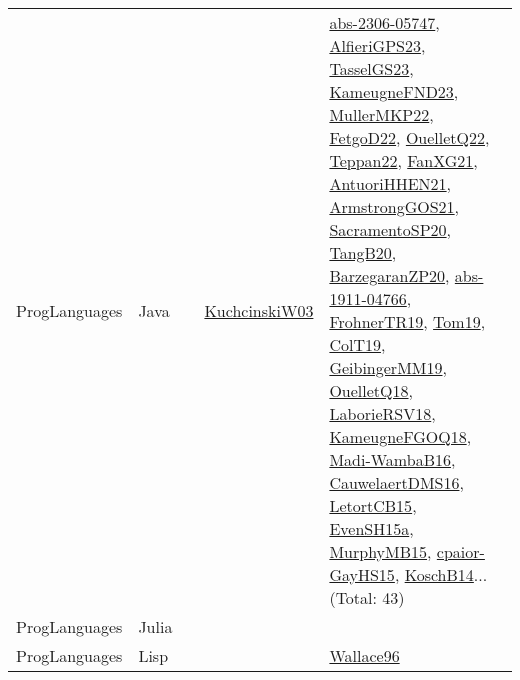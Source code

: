 {\begin{longtable}{lp{3cm}>{\raggedright}p{6cm}>{\raggedright}p{6cm}p{8cm}}
ProgLanguages & Java &  & \href{articles/KuchcinskiW03.pdf}{KuchcinskiW03}\cite{KuchcinskiW03} & \href{articles/abs-2306-05747.pdf}{abs-2306-05747}\cite{abs-2306-05747}, \href{articles/AlfieriGPS23.pdf}{AlfieriGPS23}\cite{AlfieriGPS23}, \href{papers/TasselGS23.pdf}{TasselGS23}\cite{TasselGS23}, \href{papers/KameugneFND23.pdf}{KameugneFND23}\cite{KameugneFND23}, \href{articles/MullerMKP22.pdf}{MullerMKP22}\cite{MullerMKP22}, \href{articles/FetgoD22.pdf}{FetgoD22}\cite{FetgoD22}, \href{papers/OuelletQ22.pdf}{OuelletQ22}\cite{OuelletQ22}, \href{papers/Teppan22.pdf}{Teppan22}\cite{Teppan22}, \href{articles/FanXG21.pdf}{FanXG21}\cite{FanXG21}, \href{papers/AntuoriHHEN21.pdf}{AntuoriHHEN21}\cite{AntuoriHHEN21}, \href{papers/ArmstrongGOS21.pdf}{ArmstrongGOS21}\cite{ArmstrongGOS21}, \href{articles/SacramentoSP20.pdf}{SacramentoSP20}\cite{SacramentoSP20}, \href{papers/TangB20.pdf}{TangB20}\cite{TangB20}, \href{papers/BarzegaranZP20.pdf}{BarzegaranZP20}\cite{BarzegaranZP20}, \href{articles/abs-1911-04766.pdf}{abs-1911-04766}\cite{abs-1911-04766}, \href{papers/FrohnerTR19.pdf}{FrohnerTR19}\cite{FrohnerTR19}, \href{papers/Tom19.pdf}{Tom19}\cite{Tom19}, \href{papers/ColT19.pdf}{ColT19}\cite{ColT19}, \href{papers/GeibingerMM19.pdf}{GeibingerMM19}\cite{GeibingerMM19}, \href{papers/OuelletQ18.pdf}{OuelletQ18}\cite{OuelletQ18}, \href{articles/LaborieRSV18.pdf}{LaborieRSV18}\cite{LaborieRSV18}, \href{papers/KameugneFGOQ18.pdf}{KameugneFGOQ18}\cite{KameugneFGOQ18}, \href{papers/Madi-WambaB16.pdf}{Madi-WambaB16}\cite{Madi-WambaB16}, \href{papers/CauwelaertDMS16.pdf}{CauwelaertDMS16}\cite{CauwelaertDMS16}, \href{articles/LetortCB15.pdf}{LetortCB15}\cite{LetortCB15}, \href{articles/EvenSH15a.pdf}{EvenSH15a}\cite{EvenSH15a}, \href{papers/MurphyMB15.pdf}{MurphyMB15}\cite{MurphyMB15}, \href{papers/cpaior-GayHS15.pdf}{cpaior-GayHS15}\cite{cpaior-GayHS15}, \href{papers/KoschB14.pdf}{KoschB14}\cite{KoschB14}... (Total: 43)\\
ProgLanguages & Julia &  &  & \\
ProgLanguages & Lisp &  &  & \href{articles/Wallace96.pdf}{Wallace96}\cite{Wallace96}\\

\end{longtable}}
